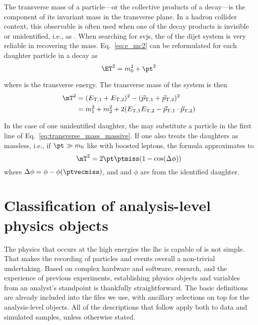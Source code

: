 The transverse mass \mT of a particle---or the collective products of a decay---is the component of its invariant mass in the transverse plane. In a hadron collider context, this observable is often used when one of the decay products is invisible or unidentified, i.e., as \ptvecmiss. When searching for \glspl{svj}, the \mT of the dijet system is very reliable in recovering the \PZprime mass. Eq.~\ref{eq:e_mc2} can be reformulated for each daughter particle in a decay as
\begin{equation}
\ET^2 = m_0^2 + \pt^2
\label{eq:transverse_energy}
\end{equation}

where \ET is the transverse energy. The transverse mass of the system is then
\begin{equation}
    \begin{aligned}
\mT^2 &= (E_{\mathrm{T,1}} + E_{\mathrm{T,2}})^2 - ({\vec p}_{\mathrm{T,1}} + {\vec p}_{\mathrm{T,2}})^2 \\
&= m_1^2 + m_2^2 + 2(E_{\mathrm{T,1}} E_{\mathrm{T,2}} - {\vec p}_{\mathrm{T,1}} \cdot {\vec p}_{\mathrm{T,2}})
    \end{aligned}
\label{eq:transverse_mass_massive}
\end{equation}

In the case of one unidentified daughter, the \ptvecmiss may substitute a particle in the first line of Eq.~\ref{eq:transverse_mass_massive}. If one also treats the daughters as massless, i.e., if $\pt \gg m_0$ like with boosted leptons, the formula approximates to
\begin{equation}
\mT^2 = 2 \pt \ptmiss (1 - \cos(\Delta\phi))
\label{eq:transverse_mass_massless}
\end{equation}
where $\Delta\phi = \phi - \phi(\ptvecmiss)$, and \pt and $\phi$ are from the identified daughter.




\section{Classification of analysis-level physics objects}
\label{sec:analysis_objects}

The physics that occurs at the high energies the \acrshort{lhc} is capable of is not simple. That makes the recording of particles and events overall a non-trivial undertaking. Based on complex hardware and software, research, and the experience of previous experiments, establishing physics objects and variables from an analyst's standpoint is thankfully straightforward. The basic definitions are already included into the \ROOT files we use, with ancillary selections on top for the analysis-level objects. All of the descriptions that follow apply both to data and simulated samples, unless otherwise stated.

